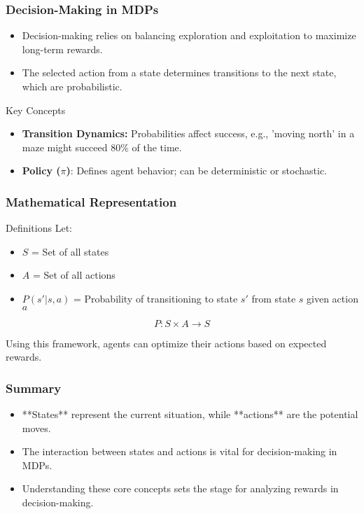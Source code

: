 \documentclass[aspectratio=169]{beamer}
\begin{document}
\begin{frame}[fragile]
    \frametitle{Decision-Making in MDPs}
    \begin{itemize}
        \item Decision-making relies on balancing exploration and exploitation to maximize long-term rewards.
        \item The selected action from a state determines transitions to the next state, which are probabilistic.
    \end{itemize}

    \begin{block}{Key Concepts}
        \begin{itemize}
            \item \textbf{Transition Dynamics:} Probabilities affect success, e.g., 'moving north' in a maze might succeed 80\% of the time.
            \item \textbf{Policy (\(\pi\))}: Defines agent behavior; can be deterministic or stochastic.
        \end{itemize}
    \end{block}
\end{frame}

\begin{frame}[fragile]
    \frametitle{Mathematical Representation}
    \begin{block}{Definitions}
        Let:
        \begin{itemize}
            \item \( S \) = Set of all states
            \item \( A \) = Set of all actions
            \item \( P(s' | s, a) \) = Probability of transitioning to state \( s' \) from state \( s \) given action \( a \)
        \end{itemize}
    \end{block}
    
    \begin{equation}
        P: S \times A \to S
    \end{equation}

    Using this framework, agents can optimize their actions based on expected rewards.
\end{frame}

\begin{frame}[fragile]
    \frametitle{Summary}
    \begin{itemize}
        \item **States** represent the current situation, while **actions** are the potential moves.
        \item The interaction between states and actions is vital for decision-making in MDPs.
        \item Understanding these core concepts sets the stage for analyzing rewards in decision-making.
    \end{itemize}
\end{frame}
\end{document}
